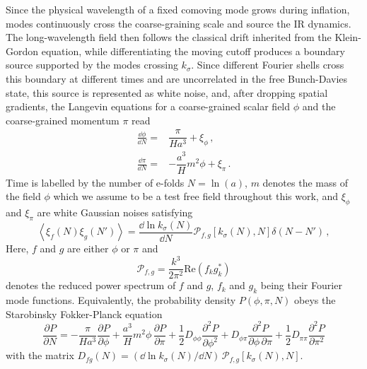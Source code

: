 \documentclass{article}
\numberwithin{equation}{section}
\begin{document}
	Since the physical wavelength of a fixed comoving mode grows during inflation, modes continuously cross the coarse-graining scale and source the IR dynamics. The long-wavelength field then follows the classical drift inherited from the Klein-Gordon equation, while differentiating the moving cutoff produces a boundary source supported by the modes crossing \(k_\sigma\). Since different Fourier shells cross this boundary at different times and are uncorrelated in the free Bunch-Davies state, this source is represented as white noise, and, after dropping spatial gradients, the Langevin equations for a coarse-grained scalar field $\phi$ and the coarse-grained momentum $\pi$ read~\cite{grain2017stochastic, vennin2025quantum}
    \begin{align}
    \label{eq:Lang:Staro:phi}
        \frac{\dd\phi}{\dd N}=& \dfrac{\pi}{Ha^3} +\xi_\phi\, ,\\
        \frac{\dd\pi}{\dd N}= & -\dfrac{a^3}{H}m^2\phi+\xi_\pi\, .
    \label{eq:Lang:Staro:pi}
\end{align}
    Time is labelled by the number of e-folds $N=\ln(a)$, $m$ denotes the mass of the field $\phi$ which we assume to be a test free field throughout this work, and $\xi_\phi$ and $\xi_\pi$ are white Gaussian noises satisfying
    \begin{equation}
        \left\langle \xi_f (N) \xi_g(N')\right\rangle=\frac{\dd \ln k_\sigma(N)}{\dd N} \mathcal{P}_{f,g}\left[k_\sigma(N),N\right]\delta(N-N')\, ,
    \end{equation}
Here, $f$ and $g$ are either $\phi$ or $\pi$ and \begin{equation}
\mathcal{P}_{f,g}=\frac{k^3}{2\pi^2} \mathrm{Re}\left(f_k g_k^*\right)
\end{equation}
denotes the reduced power spectrum of $f$ and $g$,  $f_k$ and $g_k$ being their Fourier mode functions. Equivalently, the probability density $P(\phi,\pi,N)$ obeys the Starobinsky Fokker-Planck equation
\begin{equation}
\label{eq:Staro:FP:2d}
\frac{\partial P}{\partial N} =
-\frac{\pi}{Ha^3}\frac{\partial P}{\partial \phi}
+\frac{a^3}{H}m^2\phi\,\frac{\partial P}{\partial \pi}
+\frac12 D_{\phi\phi}\frac{\partial^2 P}{\partial \phi^2}
+D_{\phi\pi}\frac{\partial^2 P}{\partial \phi\,\partial \pi}
+\frac12 D_{\pi\pi}\frac{\partial^2 P}{\partial \pi^2}
\end{equation}
with the matrix $D_{fg}(N)=(\dd \ln k_\sigma(N)/\dd N)\, \mathcal{P}_{f,g}[k_\sigma(N),N]$.
\end{document}

